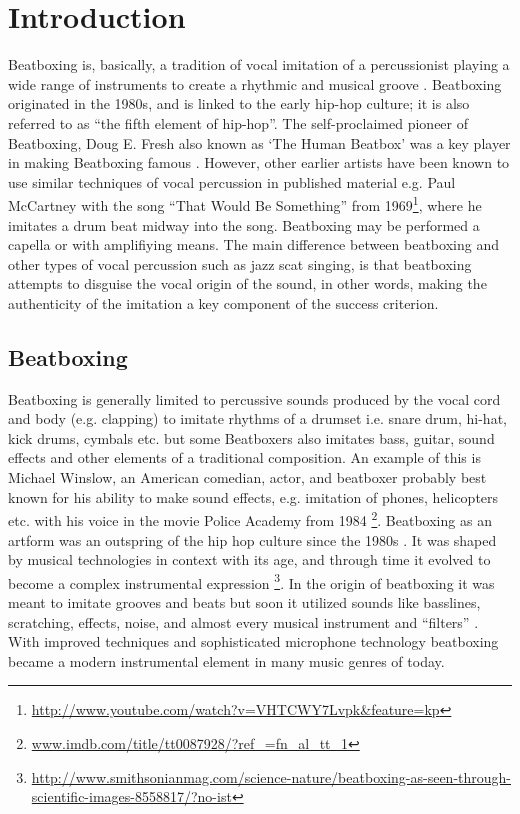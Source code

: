 \section{ Introduction }
Beatboxing is, basically, a tradition of vocal imitation of a percussionist playing a wide range of instruments to create a rhythmic and musical groove \citep{Stowell2008}. Beatboxing originated in the 1980s, and is linked to the early hip-hop culture; it is also referred to as “the fifth element of hip-hop”. The self-proclaimed pioneer of Beatboxing, Doug E. Fresh also known as ‘The Human Beatbox’ was a key player in making Beatboxing famous \citep{Hess2007}. However, other earlier artists have been known to use similar techniques of vocal percussion in published material e.g. Paul McCartney with the song “That Would Be Something” from 1969\footnote{\url{http://www.youtube.com/watch?v=VHTCWY7Lvpk&feature=kp}}, where he imitates a drum beat midway into the song. Beatboxing may be performed a capella or with amplifiying means\citep{Stowell2008}. The main difference between beatboxing and other types of vocal percussion such as jazz scat singing, is that beatboxing attempts to disguise the vocal origin of the sound\citep{Stowell2008}, in other words, making the authenticity of the imitation a key component of the success criterion. \citep{Hazan2005}


\subsection{ Beatboxing }
Beatboxing is generally limited to percussive sounds produced by the vocal cord and body (e.g. clapping) to imitate rhythms of a drumset i.e. snare drum, hi-hat, kick drums, cymbals etc. but some Beatboxers also imitates bass, guitar, sound effects and other elements of a traditional composition. An example of this is Michael Winslow, an American comedian, actor, and beatboxer probably best known for his ability to make sound effects, e.g. imitation of phones, helicopters etc. with his voice in the movie Police Academy from 1984 \footnote{\url{www.imdb.com/title/tt0087928/?ref_=fn_al_tt_1}}. Beatboxing as an artform was an outspring of the hip hop culture since the 1980s \citep{Sinyor05}. It was shaped by musical technologies in context with its age, and through time it evolved to become a complex instrumental expression \footnote{\url{http://www.smithsonianmag.com/science-nature/beatboxing-as-seen-through-scientific-images-8558817/?no-ist}}. In the origin of beatboxing it was meant to imitate grooves and beats but soon it utilized sounds like basslines, scratching, effects, noise, and almost every musical instrument and “filters” \citep{proctor2012}. With improved techniques and sophisticated microphone technology beatboxing became a modern instrumental element in many music genres of today. \citep{Benetos2012}

